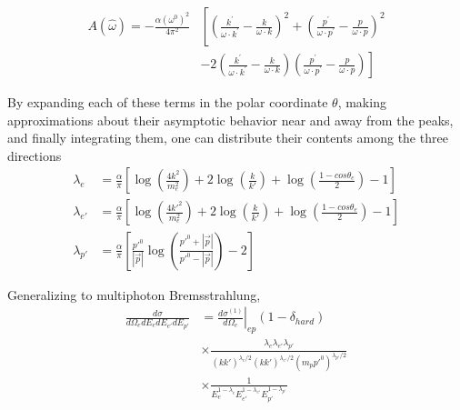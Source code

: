 \begin{align}
    A(\hat{\omega}) = -\frac{\alpha(\omega^0)^2}{4\pi^{2}}
                        &\left[\left(\frac{k^{\prime}}{\omega \cdot k^{\prime}}-\frac{k}{\omega \cdot k}\right)^{2}
                        + \left(\frac{p^{\prime}}{\omega \cdot p^{\prime}}-\frac{p}{\omega \cdot p}\right)^{2}\right.\nonumber\\
                        &\left.-2\left(\frac{k^{\prime}}{\omega \cdot k^{\prime}}-\frac{k}{\omega \cdot k}\right)
                        \left(\frac{p^{\prime}}{\omega \cdot p^{\prime}}-\frac{p}{\omega \cdot p}\right) \right]
\end{align}

By expanding each of these terms in the polar coordinate $\theta$,
making approximations about their asymptotic behavior near and away from the peaks,
and finally integrating them, one can distribute their contents among the three
directions
\begin{align}
    \lambda_e    &= \frac{\alpha}{\pi}\left[\log\left(\frac{4k^2}{m_e^2}\right) +
                                        2\log\left(\frac{k}{k'}\right) +
                                        \log\left(\frac{1-cos\theta_e}{2}\right)
                                        -1\right] \\
    \lambda_{e'} &= \frac{\alpha}{\pi}\left[\log\left(\frac{4k'^2}{m_e^2}\right) +
                                        2\log\left(\frac{k}{k'}\right) +
                                        \log\left(\frac{1-cos\theta_e}{2}\right)
                                        -1\right] \\
    \lambda_{p'} &= \frac{\alpha}{\pi}
                  \left[
                      \frac{p'^0}{|\vec{p}|}
                      \log\left(\frac{p'^0+|\vec{p}|}
                                     {p'^0-|\vec{p}|}\right)
                      - 2
                  \right]
\end{align}

Generalizing to multiphoton Bremsstrahlung,
\begin{align}
    \frac{d\sigma}{d\Omega_e dE_e dE_{e'} dE_{p'}} &= \left. \frac{d\sigma^{(1)}}{d\Omega_e}\right|_{ep} \left(1-\delta_{hard}\right) \\
    &\times\frac{\lambda_e \lambda_{e'} \lambda_{p'}} {\left(kk'\right)^{\lambda_e/2} \left(kk'\right)^{\lambda_{e'}/2} \left(m_p p'^0\right)^{\lambda_{p'}/2}} \\
    &\times\frac{1}{E_{e}^{1-\lambda_{e}} E_{e'}^{1-\lambda_{e'}} E_{p'}^{1-\lambda_{p'}}}
\end{align}

